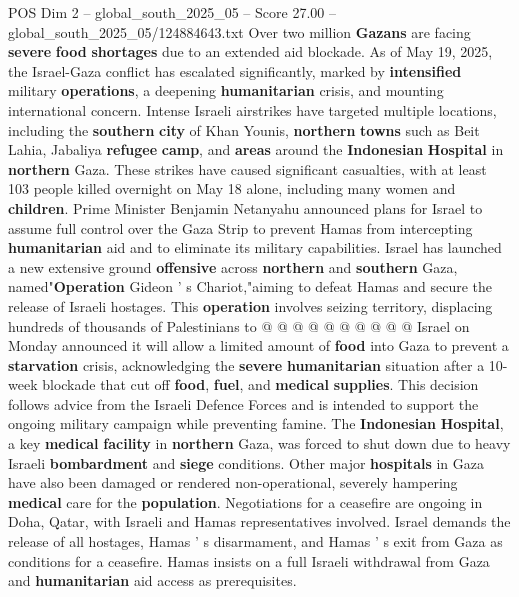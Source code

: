 \begin{textsample}{POS Dim 2 – global\_south\_2025\_05 – Score 27.00 – global\_south\_2025\_05/124884643.txt}  \label{ex:f2_pos_046}
Over two million \textbf{Gazans} are facing \textbf{severe} \textbf{food} \textbf{shortages} due to an extended aid blockade.
As of May 19, 2025, the Israel-Gaza conflict has escalated significantly, marked by \textbf{intensified} military \textbf{operations}, a deepening \textbf{humanitarian} crisis, and mounting international concern.
Intense Israeli airstrikes have targeted multiple locations, including the \textbf{southern} \textbf{city} of Khan Younis, \textbf{northern} \textbf{towns} such as Beit Lahia, Jabaliya \textbf{refugee} \textbf{camp}, and \textbf{areas} around the \textbf{Indonesian} \textbf{Hospital} in \textbf{northern} Gaza.
These strikes have caused significant casualties, with at least 103 people killed overnight on May 18 alone, including many women and \textbf{children}.
Prime Minister Benjamin Netanyahu announced plans for Israel to assume full control over the Gaza Strip to prevent Hamas from intercepting \textbf{humanitarian} aid and to eliminate its military capabilities.
Israel has launched a new extensive ground \textbf{offensive} across \textbf{northern} and \textbf{southern} Gaza, named"\textbf{Operation} Gideon ' s Chariot,"aiming to defeat Hamas and secure the release of Israeli hostages.
This \textbf{operation} involves seizing territory, displacing hundreds of thousands of Palestinians to @ @ @ @ @ @ @ @ @ @ Israel on Monday announced it will allow a limited amount of \textbf{food} into Gaza to prevent a \textbf{starvation} crisis, acknowledging the \textbf{severe} \textbf{humanitarian} situation after a 10-week blockade that cut off \textbf{food}, \textbf{fuel}, and \textbf{medical} \textbf{supplies}.
This decision follows advice from the Israeli Defence Forces and is intended to support the ongoing military campaign while preventing famine.
The \textbf{Indonesian} \textbf{Hospital}, a key \textbf{medical} \textbf{facility} in \textbf{northern} Gaza, was forced to shut down due to heavy Israeli \textbf{bombardment} and \textbf{siege} conditions.
Other major \textbf{hospitals} in Gaza have also been damaged or rendered non-operational, severely hampering \textbf{medical} care for the \textbf{population}.
Negotiations for a ceasefire are ongoing in Doha, Qatar, with Israeli and Hamas representatives involved.
Israel demands the release of all hostages, Hamas ' s disarmament, and Hamas ' s exit from Gaza as conditions for a ceasefire.
Hamas insists on a full Israeli withdrawal from Gaza and \textbf{humanitarian} aid access as prerequisites.

\end{textsample}
